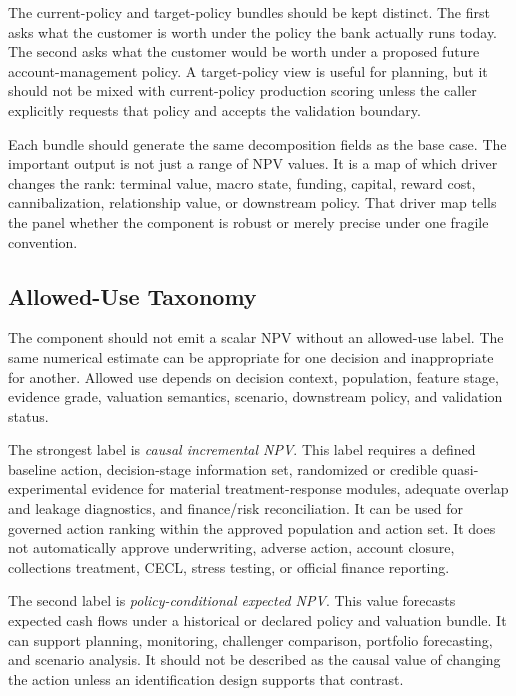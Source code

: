 \documentclass[11pt]{article}
\newcommand{\1}{\mathbf{1}}
\begin{document}
The current-policy and target-policy bundles should be kept distinct. The
first asks what the customer is worth under the policy the bank actually runs
today. The second asks what the customer would be worth under a proposed
future account-management policy. A target-policy view is useful for planning,
but it should not be mixed with current-policy production scoring unless the
caller explicitly requests that policy and accepts the validation boundary.

Each bundle should generate the same decomposition fields as the base case.
The important output is not just a range of NPV values. It is a map of which
driver changes the rank: terminal value, macro state, funding, capital,
reward cost, cannibalization, relationship value, or downstream policy. That
driver map tells the panel whether the component is robust or merely precise
under one fragile convention.

\subsection{Allowed-Use Taxonomy}
\label{sec:allowed-use-taxonomy}

The component should not emit a scalar NPV without an allowed-use label. The
same numerical estimate can be appropriate for one decision and inappropriate
for another. Allowed use depends on decision context, population, feature
stage, evidence grade, valuation semantics, scenario, downstream policy, and
validation status.

The strongest label is \emph{causal incremental NPV}. This label requires a
defined baseline action, decision-stage information set, randomized or credible
quasi-experimental evidence for material treatment-response modules, adequate
overlap and leakage diagnostics, and finance/risk reconciliation. It can be
used for governed action ranking within the approved population and action
set. It does not automatically approve underwriting, adverse action, account
closure, collections treatment, CECL, stress testing, or official finance
reporting.

The second label is \emph{policy-conditional expected NPV}. This value
forecasts expected cash flows under a historical or declared policy and
valuation bundle. It can support planning, monitoring, challenger comparison,
portfolio forecasting, and scenario analysis. It should not be described as
the causal value of changing the action unless an identification design
supports that contrast.
\end{document}
